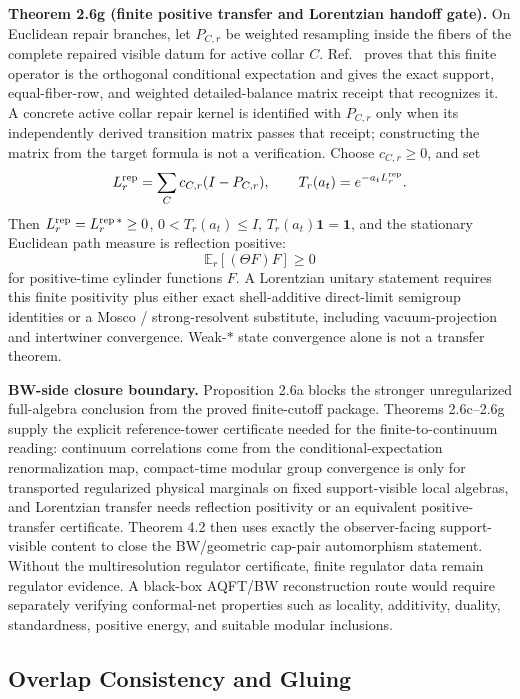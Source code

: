 \textbf{Theorem 2.6g (finite positive transfer and Lorentzian handoff gate).}\label{thm:positive-transfer-gate}
On Euclidean repair branches, let \(P_{C,r}\) be weighted resampling inside the fibers of the
complete repaired visible datum for active collar \(C\).  Ref.~\cite{observableNormalForms}
proves that this finite operator is the orthogonal conditional expectation and gives the exact
support, equal-fiber-row, and weighted detailed-balance matrix receipt that recognizes it.  A
concrete active collar repair kernel is identified with \(P_{C,r}\) only when its independently
derived transition matrix passes that receipt; constructing the matrix from the target formula is
not a verification.  Choose \(c_{C,r}\ge0\), and set
\[
L_r^{\rm rep}=\sum_C c_{C,r}(I-P_{C,r}),\qquad
T_r(a_t)=e^{-a_tL_r^{\rm rep}} .
\]
Then \(L_r^{\rm rep}=L_r^{\rm rep\,*}\ge0\), \(0<T_r(a_t)\le I\), \(T_r(a_t)\mathbf1=\mathbf1\),
and the stationary Euclidean path measure is reflection positive:
\[
\mathbb E_r[(\Theta F)F]\ge0
\]
for positive-time cylinder functions \(F\). A Lorentzian unitary statement requires this finite
positivity plus either exact shell-additive direct-limit semigroup identities or a Mosco /
strong-resolvent substitute, including vacuum-projection and intertwiner convergence. Weak-\(*\)
state convergence alone is not a transfer theorem.

\textbf{BW-side closure boundary.} Proposition 2.6a blocks the stronger unregularized full-algebra
conclusion from the proved finite-cutoff package. Theorems 2.6c--2.6g supply the explicit
reference-tower certificate needed for the finite-to-continuum reading: continuum correlations
come from the conditional-expectation renormalization map, compact-time modular group convergence
is only for transported regularized physical marginals on fixed support-visible local algebras,
and Lorentzian transfer needs reflection positivity or an equivalent positive-transfer
certificate. Theorem 4.2 then uses exactly the observer-facing support-visible content to close
the BW/geometric cap-pair automorphism statement. Without the multiresolution regulator
certificate, finite regulator data remain regulator evidence. A black-box AQFT/BW reconstruction
route would require separately verifying conformal-net properties such as locality, additivity,
duality, standardness, positive energy, and suitable modular inclusions.
\subsection{Overlap Consistency and Gluing}\label{3-overlap-consistency-and-gluing}

